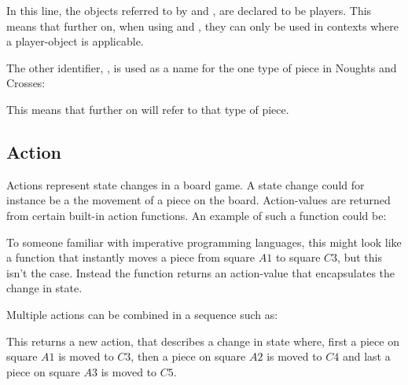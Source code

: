 
In this line, the objects referred to by  and , are declared
to be players. This means that further on, when using  and ,
they can only be used in contexts where a player-object is applicable.

The other identifier, , is used as a name for the one type of piece in
Noughts and Crosses:


This means that further on  will refer to that type of piece.


\subsection{Action}

Actions represent state changes in a board game. A state change could for instance be a the movement
of a piece on the board. Action-values are returned from certain built-in action functions. An example
of such a function could be:


To someone familiar with imperative programming languages, this might look like a function that
instantly moves a piece from square $A1$ to square $C3$, but this isn't the case. Instead the
function returns an action-value that encapsulates the change in state.

Multiple actions can be combined in a sequence such as:


This returns a new action, that describes a change in state where, first a piece on square $A1$
is moved to $C3$, then a piece on square $A2$ is moved to $C4$ and last a piece on square $A3$
is moved to $C5$.



